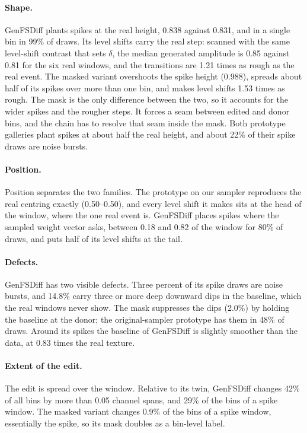 \documentclass[11pt,a4paper]{article}
\begin{document}
\paragraph{Shape.}
GenFSDiff plants spikes at the real height, 0.838 against 0.831, and in a
single bin in 99\% of draws. Its level shifts carry the real step: scanned
with the same level-shift contrast that sets $\delta$, the median generated
amplitude is 0.85 against 0.81 for the six real windows, and the transitions
are 1.21 times as rough as the real event. The masked variant overshoots the
spike height (0.988), spreads about half of its spikes over more than one bin,
and makes level shifts 1.53 times as rough. The mask is the only difference
between the two, so it accounts for the wider spikes and the rougher steps. It
forces a seam between edited and donor bins, and the chain has to resolve that
seam inside the mask. Both prototype galleries plant spikes at about half the
real height, and about 22\% of their spike draws are noise bursts.

\paragraph{Position.}
Position separates the two families. The prototype on our sampler reproduces
the real centring exactly (0.50--0.50), and every level shift it makes sits at
the head of the window, where the one real event is. GenFSDiff places spikes
where the sampled weight vector asks, between 0.18 and 0.82 of the window for
80\% of draws, and puts half of its level shifts at the tail.

\paragraph{Defects.}
GenFSDiff has two visible defects. Three percent of its spike draws are noise
bursts, and 14.8\% carry three or more deep downward dips in the baseline,
which the real windows never show. The mask suppresses the dips (2.0\%) by
holding the baseline at the donor; the original-sampler prototype has them in
48\% of draws. Around its spikes the baseline of GenFSDiff is slightly
smoother than the data, at 0.83 times the real texture.

\paragraph{Extent of the edit.}
The edit is spread over the window. Relative to its twin, GenFSDiff changes
42\% of all bins by more than 0.05 channel spans, and 29\% of the bins of a
spike window. The masked variant changes 0.9\% of the bins of a spike window,
essentially the spike, so its mask doubles as a bin-level label.
\end{document}
